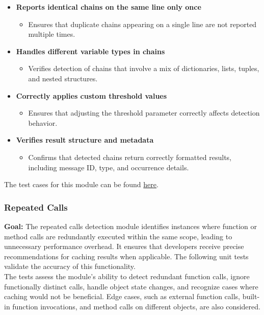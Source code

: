 \documentclass[12pt, titlepage]{article}
\begin{document}
\begin{itemize}
  \item \textbf{Reports identical chains on the same line only once}
  \begin{itemize}
      \item Ensures that duplicate chains appearing on a single line are not reported multiple times.
  \end{itemize}

  \item \textbf{Handles different variable types in chains}
  \begin{itemize}
      \item Verifies detection of chains that involve a mix of dictionaries, lists, tuples, and nested structures.
  \end{itemize}

  \item \textbf{Correctly applies custom threshold values}
  \begin{itemize}
      \item Ensures that adjusting the threshold parameter correctly affects detection behavior.
  \end{itemize}

  \item \textbf{Verifies result structure and metadata}
  \begin{itemize}
      \item Confirms that detected chains return correctly formatted results, including message ID, type, and occurrence details.
  \end{itemize}
\end{itemize}

\noindent The test cases for this module can be found \href{https://github.com/ssm-lab/capstone--source-code-optimizer/blob/new-poc/tests/analyzers/test_detect_lec.py}{here}.

\subsubsection{Repeated Calls}

\textbf{Goal:} The repeated calls detection module identifies instances where function or method calls are redundantly executed within the same scope, leading to unnecessary performance overhead. It ensures that developers receive precise recommendations for caching results when applicable. The following unit tests validate the accuracy of this functionality.\\ 

\noindent The tests assess the module’s ability to detect redundant function calls, ignore functionally distinct calls, handle object state changes, and recognize cases where caching would not be beneficial. Edge cases, such as external function calls, built-in function invocations, and method calls on different objects, are also considered. \\
\end{document}
